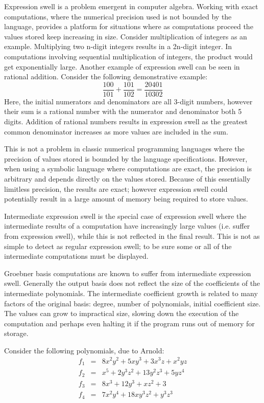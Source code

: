 \documentclass[letterpaper,12pt,titlepage,oneside,final]{book}
\begin{document}
Expression swell is a problem emergent in computer algebra.  Working with exact computations, where the numerical precision used is not bounded by the language, provides a platform for situations where as computations proceed the values stored keep increasing in size.  Consider multiplication of integers as an example.  Multiplying two n-digit integers results in a 2n-digit integer.  In computations involving sequential multiplication of integers, the product would get exponentially large.  Another example of expression swell can be seen in rational addition. Consider the following demonstrative example:
\begin{equation*}
  \frac{100}{101} + \frac{101}{102} = \frac{20401}{10302}
\end{equation*}
Here, the initial numerators and denominators are all 3-digit numbers, however their sum is a rational number with the numerator and denominator both 5 digits.  Addition of rational numbers results in expression swell as the greatest common denominator increases as more values are included in the sum.

This is not a problem in classic numerical programming languages where the precision of values stored is bounded by the language specifications.  However, when using a symbolic language where computations are exact, the precision is arbitrary and depends directly on the values stored.  Because of this essentially limitless precision, the results are exact; however expression swell could potentially result in a large amount of memory being required to store values.

Intermediate expression swell is the special case of expression swell where the intermediate results of a computation have increasingly large values (i.e. suffer from expression swell), while this is not reflected in the final result.  This is not as simple to detect as regular expression swell; to be sure some or all of the intermediate computations must be displayed. 

Groebner basis computations are known to suffer from intermediate expression swell.  Generally the output basis does not reflect the size of the coefficients of the intermediate polynomials.  The intermediate coefficient growth is related to many factors of the original basis: degree, number of polynomials, initial coefficient size.  The values can grow to impractical size, slowing down the execution of the computation and perhaps even halting it if the program runs out of memory for storage.  

Consider the following polynomials, due to Arnold: %
\begin{eqnarray*}
  f_1 &=& 8x^2y^2 + 5xy^3 + 3x^3z + x^2yz\\
  f_2 &=& x^5 + 2y^3z^2 + 13y^2z^3 + 5yz^4\\ 
  f_3 &=& 8x^3 + 12y^3 + xz^2 + 3\\
  f_4 &=& 7x^2y^4 + 18xy^3z^2 + y^3z^3
\end{eqnarray*} 
\end{document}
